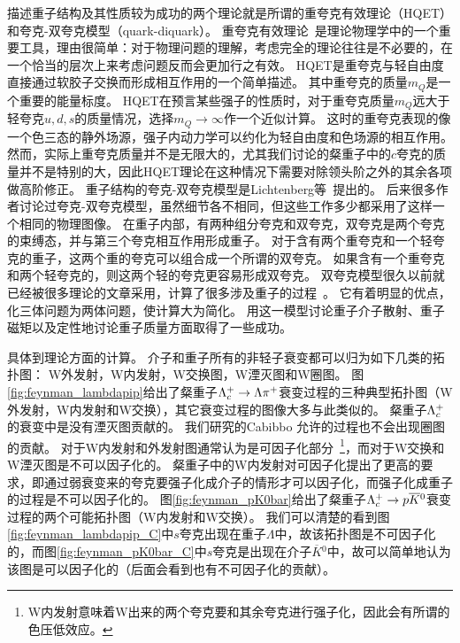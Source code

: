 描述重子结构及其性质较为成功的两个理论就是所谓的重夸克有效理论（HQET）和夸克-双夸克模型（quark-diquark）。
重夸克有效理论~\cite{Georgi:1991ch,Neubert:1993mb}是理论物理学中的一个重要工具，理由很简单：对于物理问题的理解，考虑完全的理论往往是不必要的，在一个恰当的层次上来考虑问题反而会更加行之有效。
HQET是重夸克与轻自由度直接通过软胶子交换而形成相互作用的一个简单描述。
其中重夸克的质量$m_{Q}$是一个重要的能量标度。
HQET在预言某些强子的性质时，对于重夸克质量$m_{Q}$远大于轻夸克$u,d,s$的质量情况，选择$m_{Q}\to \infty$作一个近似计算。
这时的重夸克表现的像一个色三态的静外场源，强子内动力学可以约化为轻自由度和色场源的相互作用。
然而，实际上重夸克质量并不是无限大的，尤其我们讨论的粲重子中的$c$夸克的质量并不是特别的大，因此HQET理论在这种情况下需要对除领头阶之外的其余各项做高阶修正。
重子结构的夸克-双夸克模型是Lichtenberg等~\cite{Lichtenberg:1967zz}提出的。
后来很多作者讨论过夸克-双夸克模型，虽然细节各不相同，但这些工作多少都采用了这样一个相同的物理图像。
在重子内部，有两种组分夸克和双夸克，双夸克是两个夸克的束缚态，并与第三个夸克相互作用形成重子。
对于含有两个重夸克和一个轻夸克的重子，这两个重的夸克可以组合成一个所谓的双夸克。
如果含有一个重夸克和两个轻夸克的，则这两个轻的夸克更容易形成双夸克。
双夸克模型很久以前就已经被很多理论的文章采用，计算了很多涉及重子的过程~\cite{Anselmino:1987vk, Kroll:1987pj,Mannel:1990vg,Leinweber:1993nr,Ebert:1995fp}。
它有着明显的优点，化三体问题为两体问题，使计算大为简化。
用这一模型讨论重子介子散射、重子磁矩以及定性地讨论重子质量方面取得了一些成功。


具体到理论方面的计算。
介子和重子所有的非轻子衰变都可以归为如下几类的拓扑图： W外发射，W内发射，W交换图，W湮灭图和W圈图。
图\ref{fig:feynman_lambdapip}给出了粲重子$\Lambda_{c}^{+}\rightarrow \Lambda {\ensuremath{{\pi}^+}}$衰变过程的三种典型拓扑图（W外发射，W内发射和W交换），其它衰变过程的图像大多与此类似的。
粲重子$\Lambda_{c}^{+}$的衰变中是没有湮灭图贡献的。
我们研究的Cabibbo 允许的过程也不会出现圈图的贡献。
对于W内发射和外发射图通常认为是可因子化部分~\footnote{ W内发射意味着W出来的两个夸克要和其余夸克进行强子化，因此会有所谓的色压低效应。}，而对于W交换和W湮灭图是不可以因子化的。
粲重子中的W内发射对可因子化提出了更高的要求，即通过弱衰变来的夸克要强子化成介子的情形才可以因子化，而强子化成重子的过程是不可以因子化的。
图\ref{fig:feynman_pK0bar}给出了粲重子$\Lambda_{c}^{+}\rightarrow p \overline{K}{}^{0}$衰变过程的两个可能拓扑图（W内发射和W交换）。
我们可以清楚的看到图\ref{fig:feynman_lambdapip_C}中$s$夸克出现在重子$\Lambda$中，故该拓扑图是不可因子化的，而图\ref{fig:feynman_pK0bar_C}中$s$夸克是出现在介子$\overline{K}{}^{0}$中，故可以简单地认为该图是可以因子化的（后面会看到也有不可因子化的贡献）。

